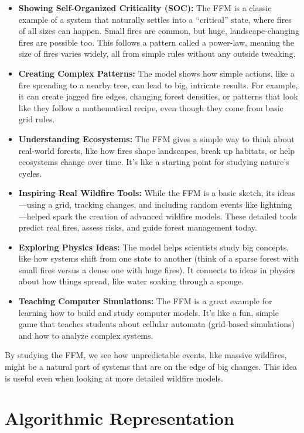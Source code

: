 \documentclass{article}
\begin{document}
\begin{itemize}
    \item \textbf{Showing Self-Organized Criticality (SOC):} The FFM is a classic example of a system that naturally settles into a ``critical'' state, where fires of all sizes can happen. Small fires are common, but huge, landscape-changing fires are possible too. This follows a pattern called a power-law, meaning the size of fires varies widely, all from simple rules without any outside tweaking.
    \item \textbf{Creating Complex Patterns:} The model shows how simple actions, like a fire spreading to a nearby tree, can lead to big, intricate results. For example, it can create jagged fire edges, changing forest densities, or patterns that look like they follow a mathematical recipe, even though they come from basic grid rules.
    \item \textbf{Understanding Ecosystems:} The FFM gives a simple way to think about real-world forests, like how fires shape landscapes, break up habitats, or help ecosystems change over time. It’s like a starting point for studying nature’s cycles.
    \item \textbf{Inspiring Real Wildfire Tools:} While the FFM is a basic sketch, its ideas---using a grid, tracking changes, and including random events like lightning---helped spark the creation of advanced wildfire models. These detailed tools predict real fires, assess risks, and guide forest management today.
    \item \textbf{Exploring Physics Ideas:} The model helps scientists study big concepts, like how systems shift from one state to another (think of a sparse forest with small fires versus a dense one with huge fires). It connects to ideas in physics about how things spread, like water soaking through a sponge.
    \item \textbf{Teaching Computer Simulations:} The FFM is a great example for learning how to build and study computer models. It’s like a fun, simple game that teaches students about cellular automata (grid-based simulations) and how to analyze complex systems.
\end{itemize}

By studying the FFM, we see how unpredictable events, like massive wildfires, might be a natural part of systems that are  on the edge of big changes. This idea is useful even when looking at more detailed wildfire models.

\section{Algorithmic Representation}
\end{document}
